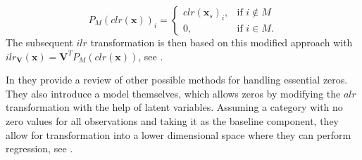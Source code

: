 \begin{equation}
P_M(clr(\bm{x}))_i =
\begin{cases}
clr(\bm{x}_s)_i, & \text{if } i \notin M \\
0, & \text{if } i \in M.
\end{cases}
\label{eq:clr Projection}
\end{equation}
%
The subsequent $ilr$ transformation is then based on this modified approach with $ ilr_{\textbf{V}}(\textbf{x}) = \textbf{V}^T P_M(clr(\textbf{x}))$, see \textcite{Compositions:2023}.

In \textcite{Leininger:2013} they provide a review of other possible methods for handling essential zeros. They also introduce a model themselves, which allows zeros by modifying the $alr$ transformation with the help of latent variables. Assuming a category with no zero values for all observations and taking it as the baseline component, they allow for transformation into a lower dimensional space where they can perform regression, see \textcite{Leininger:2013}.

